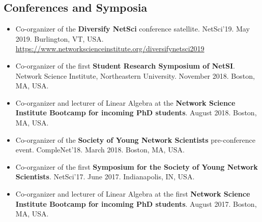 \documentclass[12pt,]{scrartcl}
\begin{document}
\subsection{Conferences and Symposia}\label{conferences}

\begin{itemize}
\leftskip-0.25in

\item Co-organizer of the \textbf{Diversify NetSci} conference satellite. NetSci'19. May 2019. Burlington, VT, USA. \url{https://www.networkscienceinstitute.org/diversifynetsci2019}

\item Co-organizer of the first \textbf{Student Research Symposium of NetSI}. Network Science Institute, Northeastern University. November 2018. Boston, MA, USA.

\item Co-organizer and lecturer of Linear Algebra at the \textbf{Network Science Institute Bootcamp for incoming PhD students}. August 2018. Boston, MA, USA.

\item Co-organizer of the \textbf{Society of Young Network Scientists} pre-conference event. CompleNet'18. March 2018. Boston, MA, USA.

\item Co-organizer of the first \textbf{Symposium for the Society of Young Network Scientists}. NetSci'17. June 2017. Indianapolis, IN, USA.

\item Co-organizer and lecturer of Linear Algebra at the first \textbf{Network Science Institute Bootcamp for incoming PhD students}. August 2017. Boston, MA, USA.

\end{itemize}
\end{document}
